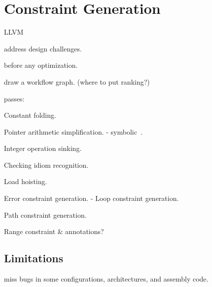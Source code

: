 \section{Constraint Generation}
\label{s:gen}

LLVM~\cite{lattner:llvm}

address design challenges.

before any optimization.

draw a workflow graph. (where to put ranking?)

passes:


Constant folding.

Pointer arithmetic simplification.
- symbolic~\cite{engelen:symbolic}.

Integer operation sinking.

Checking idiom recognition.

Load hoisting.

Error constraint generation.
- Loop constraint generation.

Path constraint generation.

Range constraint \& annotations?

\subsection{Limitations}

miss bugs in some configurations, architectures,
and assembly code.
